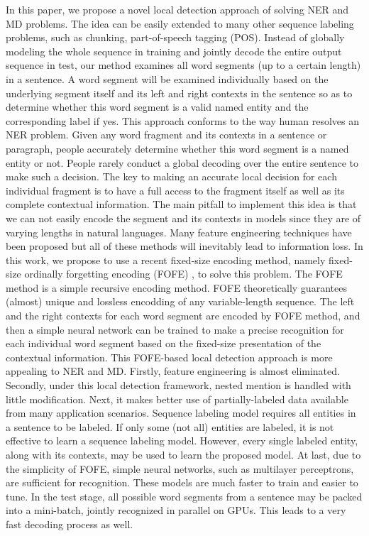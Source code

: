 \documentclass[11pt,a4paper]{article}
\begin{document}
In this paper, we propose a novel local detection approach of solving NER and MD problems. The idea can be easily extended to many other sequence labeling problems, such as chunking, part-of-speech tagging (POS). Instead of globally modeling the whole sequence in training and jointly decode the entire output sequence in test, 
our method examines all word segments (up to a certain length) in a sentence. A word segment will be examined individually based on the underlying segment itself and its left and right contexts in the sentence so as to determine whether this word segment is a valid named entity and the corresponding label if yes. 
This approach conforms to the way human resolves an NER problem. Given any word fragment and its contexts in a sentence or paragraph, people accurately determine whether this word segment is a named entity or not. People rarely conduct a global decoding over the entire sentence to make such a decision. 
The key to making an accurate local decision for each individual fragment is to have a full access to the fragment itself as well as its complete contextual information. 
The main pitfall to implement this idea is that we can not easily encode the segment and its contexts in models since they are of varying lengths in natural languages. Many feature engineering techniques have been proposed but all of these methods will inevitably lead to information loss. 
In this work, we propose to use a recent fixed-size encoding method, namely fixed-size ordinally forgetting encoding (FOFE) \cite{zhang2015fixed}, to solve this problem.  The FOFE method is a simple recursive encoding method. FOFE theoretically guarantees (almost) unique and lossless encodding of any variable-length sequence. The left and the right contexts for each word segment are encoded by FOFE method, and then a simple neural network can be trained to make a precise recognition for each individual word segment based on the fixed-size presentation of the contextual information. This FOFE-based local detection approach is more appealing to NER and MD. Firstly, feature engineering is almost eliminated. 
Secondly, under this local detection framework, nested mention is handled with little modification. Next, it makes better use of partially-labeled data available from many application scenarios. Sequence labeling model requires all entities in a sentence to be labeled. If only some (not all) entities are labeled, it is not effective to learn a sequence labeling model. However, every single labeled entity, along with its contexts, may be used to learn the proposed model. At last, due to the simplicity of FOFE, simple neural networks, such as multilayer perceptrons, are sufficient for recognition. These models are much faster to train and easier to tune. In the test stage, all possible word segments from a sentence may be packed into a mini-batch, jointly recognized in parallel on GPUs. This leads to a very fast decoding process as well.
\end{document}
